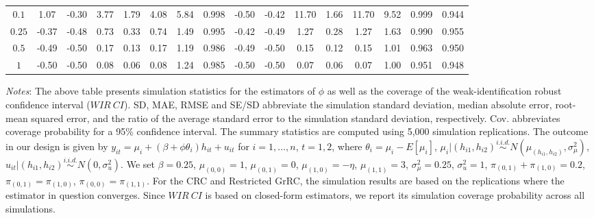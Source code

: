 \documentclass{article}[11pt]
\begin{document}
\begin{landscape}
\begin{table}[ht]
{{\begin{threeparttable}
\begin{tabular}{@{}cccccccccccccccc@{}}
     $0.1$  &  1.07  & -0.30 & 3.77  & 1.79  & 4.08  & 5.84  & 0.998    & -0.50 & -0.42 & 11.70 & 1.66  & 11.70 & 9.52     & 0.999 & 0.944  \\
     $0.25$ &  -0.37 & -0.48 & 0.73  & 0.33  & 0.74  & 1.49  & 0.995    & -0.42 & -0.49 & 1.27  & 0.28  & 1.27  & 1.63     & 0.990 & 0.955  \\
     $0.5$  &  -0.49 & -0.50 & 0.17  & 0.13  & 0.17  & 1.19  & 0.986    & -0.49 & -0.50 & 0.15  & 0.12  & 0.15  & 1.01     & 0.963 & 0.950  \\
     $1$    &  -0.50 & -0.50 & 0.08  & 0.06  & 0.08  & 1.24  & 0.985    & -0.50 & -0.50 & 0.07  & 0.06  & 0.07  & 1.00     & 0.951 & 0.948  \\
    \bottomrule
    \end{tabular}

{\footnotesize\begin{tablenotes}[flushleft]
\item 
\item{
\emph{Notes}: The above table presents simulation statistics for the estimators of $\phi$ as well as the coverage of the weak-identification robust confidence interval ($WIR ~CI$). SD, MAE, RMSE and SE/SD abbreviate the simulation standard deviation, median absolute error, root-mean squared error, and the ratio of the average standard error to the simulation standard deviation, respectively. Cov. abbreviates coverage probability for a 95\% confidence interval. The summary statistics are computed using 5,000 simulation replications. The outcome in our design is given by 
	$
y_{it} =\mu_{i}+(\beta+\phi\theta_{i})h_{it}+u_{it}$ for $i=1,\dots,n$, $t=1,2$, where $\theta_{i}=\mu_{i}-E[\mu_{i}]$, $\mu_{i}|(h_{i1},h_{i2})\overset{i.i.d.}{\sim} N(\mu_{(h_{i1},h_{i2})},\sigma_{\mu}^2)$, $u_{it}|(h_{i1},h_{i2})\overset{i.i.d.}{\sim} N(0,\sigma_u^2)$. We set $\beta = 0.25$, $\mu_{(0,0)}=1$, $\mu_{(0,1)}=0$, $\mu_{(1,0)}=-\eta$, $\mu_{(1,1)}=3$, $\sigma_{\mu}^2=0.25$, $\sigma_u^2=1$, $\pi_{(0,1)}+\pi_{(1,0)}=0.2$, $\pi_{(0,1)}=\pi_{(1,0)}$, $\pi_{(0,0)}=\pi_{(1,1)}$. For the CRC and Restricted GrRC, the simulation results are based on the replications where the estimator in question converges. Since $WIR~CI$ is based on closed-form estimators, we report its simulation coverage probability across all simulations. }

\end{tablenotes}}
\end{threeparttable}
    }
}
\end{table}

\end{landscape}
\end{document}
